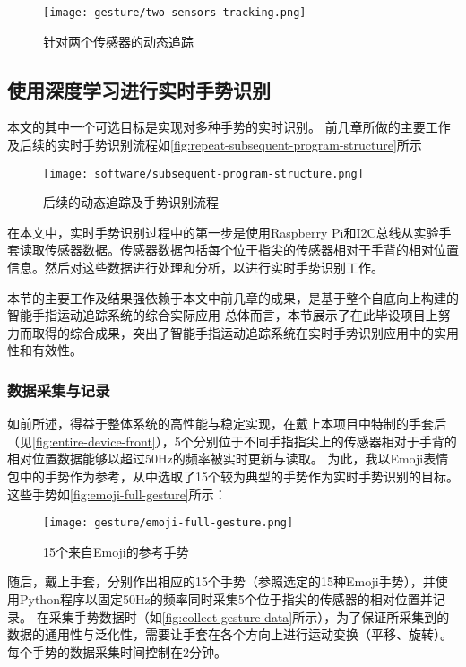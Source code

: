 \begin{figure}[H]
    \centering
    \texttt{[image: gesture/two-sensors-tracking.png]}
    \caption{\label{fig:two-sensors-tracking}针对两个传感器的动态追踪}
\end{figure}


\subsection{使用深度学习进行实时手势识别}
本文的其中一个可选目标是实现对多种手势的实时识别。
前几章所做的主要工作及后续的实时手势识别流程如\autoref{fig:repeat-subsequent-program-structure}所示

\begin{figure}[H]
    \centering
    \texttt{[image: software/subsequent-program-structure.png]}
    \caption{\label{fig:repeat-subsequent-program-structure}后续的动态追踪及手势识别流程}
\end{figure}

在本文中，实时手势识别过程中的第一步是使用Raspberry Pi和I2C总线从实验手套读取传感器数据。传感器数据包括每个位于指尖的传感器相对于手背的相对位置信息。然后对这些数据进行处理和分析，以进行实时手势识别工作。

本节的主要工作及结果强依赖于本文中前几章的成果，是基于整个自底向上构建的智能手指运动追踪系统的综合实际应用
总体而言，本节展示了在此毕设项目上努力而取得的综合成果，突出了智能手指运动追踪系统在实时手势识别应用中的实用性和有效性。

\subsubsection{数据采集与记录}
如前所述，得益于整体系统的高性能与稳定实现，在戴上本项目中特制的手套后（见\autoref{fig:entire-device-front}），5个分别位于不同手指指尖上的传感器相对于手背的相对位置数据能够以超过50Hz的频率被实时更新与读取。
为此，我以Emoji表情包中的手势作为参考，从中选取了15个较为典型的手势作为实时手势识别的目标。这些手势如\autoref{fig:emoji-full-gesture}所示：

\begin{figure}[H]
    \centering
    \texttt{[image: gesture/emoji-full-gesture.png]}
    \caption{\label{fig:emoji-full-gesture}15个来自Emoji的参考手势}
\end{figure}

随后，戴上手套，分别作出相应的15个手势（参照选定的15种Emoji手势），并使用Python程序以固定50Hz的频率同时采集5个位于指尖的传感器的相对位置并记录。
在采集手势数据时（如\autoref{fig:collect-gesture-data}所示），为了保证所采集到的数据的通用性与泛化性，需要让手套在各个方向上进行运动变换（平移、旋转）。每个手势的数据采集时间控制在2分钟。


